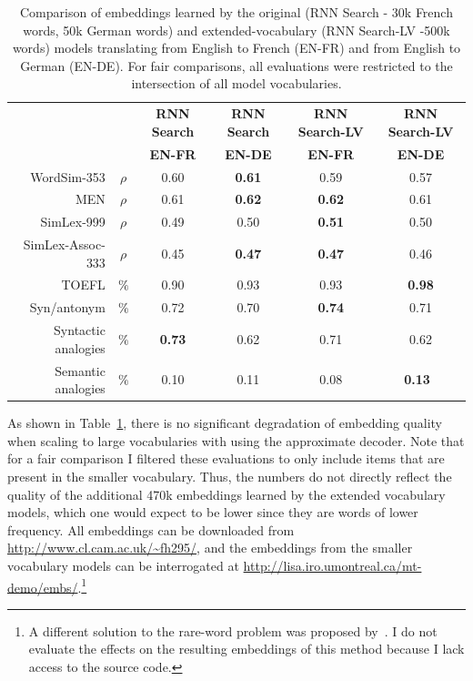 \begin{table}[t]
\begin{center}
\begin{tabular}{r c | c c c c }
    \multicolumn{2}{c|}{~} &\bf RNN Search &\bf RNN Search & \bf RNN Search-LV  & \bf RNN Search-LV  \\ 
 \multicolumn{2}{c|}{~} &\bf \small EN-FR &\bf \small  EN-DE & \bf  \small EN-FR & \bf \small EN-DE \\ 
\hline
WordSim-353   & \(\rho\) & 0.60 & \bf 0.61 & 0.59 & 0.57  \\
MEN & \(\rho\) & 0.61 & \bf 0.62 & \bf 0.62 & 0.61 \\
SimLex-999 & \(\rho\) & 0.49 & 0.50 & \bf  0.51 & 0.50  \\
SimLex-Assoc-333 & \(\rho\) & 0.45  & \bf 0.47  & \bf 0.47  & 0.46   \\
TOEFL & \(\%\) & 0.90 & 0.93 & 0.93 & \bf 0.98  \\
Syn/antonym & \(\%\) & 0.72 &  0.70 & \bf 0.74 & 0.71 \\
Syntactic analogies & \(\%\) & \bf 0.73 &  0.62 & 0.71 & 0.62\\
Semantic analogies & \(\%\) & 0.10 &  0.11 & 0.08 & \bf 0.13\
\end{tabular}
\caption{Comparison of embeddings learned by the original (RNN Search - 30k French words, 50k German words) and extended-vocabulary (RNN Search-LV -500k words) models translating from English to French (EN-FR) and from English to German (EN-DE). For fair comparisons, all evaluations were restricted to the intersection of all model vocabularies.}
\label{table:ex}
\end{center}
\vspace{-5mm}
\end{table}

As shown in Table~\ref{table:ex}, there is no significant degradation of embedding quality when scaling to large vocabularies with using the approximate decoder. Note that for a fair comparison I filtered these evaluations to only include items that are present in the smaller vocabulary. Thus, the numbers do not directly reflect the quality of the additional 470k embeddings learned by the extended vocabulary models, which one would expect to be lower since they are words of lower frequency. All embeddings can be downloaded from \url{http://www.cl.cam.ac.uk/~fh295/}, and the embeddings from the smaller vocabulary models can be interrogated at \url{http://lisa.iro.umontreal.ca/mt-demo/embs/}.\footnote{A different solution to the rare-word problem was proposed by~\cite{luong2014addressing}. I do not evaluate the effects on the resulting embeddings of this method because I lack access to the source code.} 


